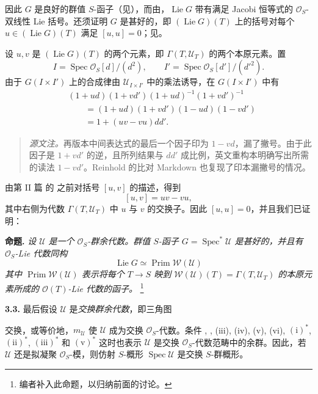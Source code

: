 因此 \(G\) 是良好的群值 \(S\)-函子（见），而由，\(\operatorname{Lie}G\) 带有满足 Jacobi 恒等式的 \(\mathcal O_S\)-双线性 Lie 括号。还须证明 \(G\) 是甚好的，即 \((\operatorname{Lie}G)(T)\) 上的括号对每个 \(u\in(\operatorname{Lie}G)(T)\) 满足 \([u,u]=0\)；见。

设 \(u,v\) 是 \((\operatorname{Lie}G)(T)\) 的两个元素，即 \(\Gamma(T,\mathcal U_T)\) 的两个本原元素。置
\[
  I=\operatorname{Spec}\mathcal O_S[d]/(d^2),
  \qquad
  I'=\operatorname{Spec}\mathcal O_S[d']/(d'^2).
\]
由于 \(G(I\times I')\) 上的合成律由 \(\mathcal U_{I\times I'}\) 中的乘法诱导，在 \(G(I\times I')\) 中有
\[
  \begin{aligned}
  &(1+ud)(1+vd')(1+ud)^{-1}(1+vd')^{-1}\\
  &\qquad
    =(1+ud)(1+vd')(1-ud)(1-vd')\\
  &\qquad
    =1+(uv-vu)dd'.
  \end{aligned}
\]
\begin{quote}
\small
{}
\label{sga3:VIIA:3.2.3-source-note-missing-prime}
\emph{源文注。}再版本中间表达式的最后一个因子印为 \(1-vd\)，漏了撇号。由于此因子是 \(1+vd'\) 的逆，且所列结果与 \(dd'\) 成比例，英文重构本明确写出所需的读法 \(1-vd'\)。Reinhold 的比对 Markdown 也复现了印本漏撇号的情况。
\end{quote}
由第 II 篇 的 之前对括号 \([u,v]\) 的描述，得到
\[
  [u,v]=uv-vu,
\]
其中右侧为代数 \(\Gamma(T,\mathcal U_T)\) 中 \(u\) 与 \(v\) 的交换子。因此 \([u,u]=0\)，并且我们已证明：

\medskip
\noindent\textbf{命题.}
\label{sga3:VIIA:3.2.3-primitive-elements-proposition}
\textit{设 \(\mathcal U\) 是一个 \(\mathcal O_S\)-群余代数。群值 \(S\)-函子 \(G=\operatorname{Spec}^{*}\mathcal U\) 是甚好的，并且有 \(\mathcal O_S\)-Lie 代数同构
\[
  \operatorname{Lie}G
  \simeq
  \operatorname{Prim}\mathcal W(\mathcal U)
\]
其中 \(\operatorname{Prim}\mathcal W(\mathcal U)\) 表示将每个 \(T\to S\) 映到 \(\mathcal W(\mathcal U)(T)=\Gamma(T,\mathcal U_T)\) 的本原元素所成的 \(\mathcal O(T)\)-Lie 代数的函子。}
\footnote{编者补入此命题，以归纳前面的讨论。}

\medskip
\noindent\textbf{3.3.}
\label{sga3:VIIA:3.3}
最后假设 \(\mathcal U\) 是\emph{交换群余代数}，即三角图
\begin{center}
  \label{sga3:VIIA:3.3-commutative-triangle-i-star}
  
\end{center}
交换，或等价地，\(m_{\mathcal U}\) 使 \(\mathcal U\) 成为交换 \(\mathcal O_S\)-代数。条件 , , (iii), (iv), (v), (vi),
\((\mathrm{i})^{*}\), \((\mathrm{ii})^{*}\),
\((\mathrm{iii})^{*}\) 和 \((\mathrm{v})^{*}\) 这时也表示 \(\mathcal U\) 是交换 \(\mathcal O_S\)-代数范畴中的余群。因此，若 \(\mathcal U\) 还是拟凝聚 \(\mathcal O_S\)-模，则仿射 \(S\)-概形 \(\operatorname{Spec}\mathcal U\) 是交换 \(S\)-群概形。

